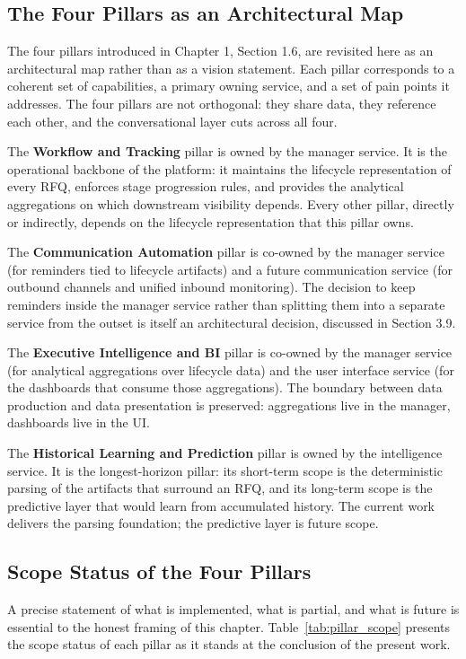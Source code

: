 \subsection*{The Four Pillars as an Architectural Map}
The four pillars introduced in Chapter 1, Section 1.6, are revisited here as an architectural map rather than as a vision statement. Each pillar corresponds to a coherent set of capabilities, a primary owning service, and a set of pain points it addresses. The four pillars are not orthogonal: they share data, they reference each other, and the conversational layer cuts across all four.

The \textbf{Workflow and Tracking} pillar is owned by the manager service. It is the operational backbone of the platform: it maintains the lifecycle representation of every RFQ, enforces stage progression rules, and provides the analytical aggregations on which downstream visibility depends. Every other pillar, directly or indirectly, depends on the lifecycle representation that this pillar owns.

The \textbf{Communication Automation} pillar is co-owned by the manager service (for reminders tied to lifecycle artifacts) and a future communication service (for outbound channels and unified inbound monitoring). The decision to keep reminders inside the manager service rather than splitting them into a separate service from the outset is itself an architectural decision, discussed in Section 3.9.

The \textbf{Executive Intelligence and BI} pillar is co-owned by the manager service (for analytical aggregations over lifecycle data) and the user interface service (for the dashboards that consume those aggregations). The boundary between data production and data presentation is preserved: aggregations live in the manager, dashboards live in the UI.

The \textbf{Historical Learning and Prediction} pillar is owned by the intelligence service. It is the longest-horizon pillar: its short-term scope is the deterministic parsing of the artifacts that surround an RFQ, and its long-term scope is the predictive layer that would learn from accumulated history. The current work delivers the parsing foundation; the predictive layer is future scope.

\subsection*{Scope Status of the Four Pillars}
A precise statement of what is implemented, what is partial, and what is future is essential to the honest framing of this chapter. Table~\ref{tab:pillar_scope} presents the scope status of each pillar as it stands at the conclusion of the present work.

